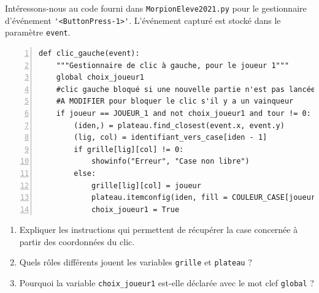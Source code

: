 \documentclass[a4paper, french, 12pt]{article}  %
\newcounter{exo}
\newcounter{exoB}
\newenvironment{exerciceB2}
{\par \bigskip  \noindent \addtocounter{exoB}{1} \hrulefill \quad { \large \textbf{Exercice \theexoB}} \quad \hrulefill \par \medskip }
{\par \bigskip }
\newcounter{def}
\begin{document}
\begin{exerciceB2}{}

Intéressons-nous au code fourni dans \lstinline+MorpionEleve2021.py+ pour le gestionnaire d'événement \lstinline+'<ButtonPress-1>'+. L'événement capturé est stocké dans le paramètre \lstinline+event+.


\begin{lstlisting}[numbers = left]
def clic_gauche(event):
    """Gestionnaire de clic à gauche, pour le joueur 1"""
    global choix_joueur1
    #clic gauche bloqué si une nouvelle partie n'est pas lancée
    #A MODIFIER pour bloquer le clic s'il y a un vainqueur
    if joueur == JOUEUR_1 and not choix_joueur1 and tour != 0:
        (iden,) = plateau.find_closest(event.x, event.y)
        (lig, col) = identifiant_vers_case[iden - 1]
        if grille[lig][col] != 0:
            showinfo("Erreur", "Case non libre")
        else:
            grille[lig][col] = joueur
            plateau.itemconfig(iden, fill = COULEUR_CASE[joueur])
            choix_joueur1 = True
\end{lstlisting}

\begin{enumerate}
	\item Expliquer les instructions qui permettent de récupérer la case concernée à partir des coordonnées
	du clic.
	\item Quels rôles différents jouent les variables \lstinline+grille+ et \lstinline+plateau+ ?
	\item Pourquoi la variable \lstinline+choix_joueur1+ est-elle déclarée avec le mot clef \lstinline+global+ ?
\end{enumerate}


\end{exerciceB2}
\end{document}
